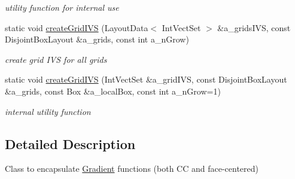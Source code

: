 \begin{DoxyCompactItemize}
\begin{DoxyCompactList}\small\item\em utility function for internal use \end{DoxyCompactList}\item 
static void \hyperlink{class_gradient_a85f5cea4187536e8430d485a306b131d}{create\-Grid\-I\-V\-S} (Layout\-Data$<$ Int\-Vect\-Set $>$ \&a\-\_\-grids\-I\-V\-S, const Disjoint\-Box\-Layout \&a\-\_\-grids, const int a\-\_\-n\-Grow)
\begin{DoxyCompactList}\small\item\em create grid I\-V\-S for all grids \end{DoxyCompactList}\item 
static void \hyperlink{class_gradient_ab8d450f2f5e455e2a33ef3a33b2f5a98}{create\-Grid\-I\-V\-S} (Int\-Vect\-Set \&a\-\_\-grid\-I\-V\-S, const Disjoint\-Box\-Layout \&a\-\_\-grids, const Box \&a\-\_\-local\-Box, const int a\-\_\-n\-Grow=1)
\begin{DoxyCompactList}\small\item\em internal utility function \end{DoxyCompactList}\end{DoxyCompactItemize}


\subsection{Detailed Description}
Class to encapsulate \hyperlink{class_gradient}{Gradient} functions (both C\-C and face-\/centered) 

